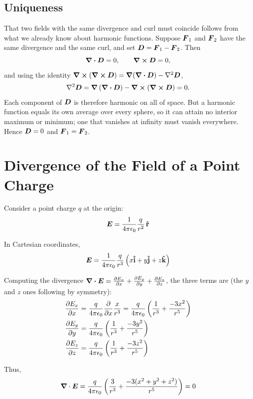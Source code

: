 \subsection{Uniqueness}

That two fields with the same divergence and curl must coincide follows from what we already know about harmonic functions. Suppose $\vect{F}_1$ and $\vect{F}_2$ have the same divergence and the same curl, and set $\vect{D} = \vect{F}_1 - \vect{F}_2$. Then
\[
    \div\vect{D} = 0, \qquad \curl\vect{D} = 0,
\]
and using the identity $\curl(\curl\vect{D}) = \grad(\div\vect{D}) - \laplacian{\vect{D}}$,
\[
    \laplacian{\vect{D}} = \grad\left(\div\vect{D}\right) - \curl\left(\curl\vect{D}\right) = 0 .
\]
Each component of $\vect{D}$ is therefore harmonic on all of space. But a harmonic function equals its own average over every sphere, so it can attain no interior maximum or minimum; one that vanishes at infinity must vanish everywhere. Hence $\vect{D} = 0$ and $\vect{F}_1 = \vect{F}_2$.

\section{Divergence of the Field of a Point Charge}

Consider a point charge $q$ at the origin:
\[
    \vect{E} = \frac{1}{4\pi\epsilon_0} \frac{q}{r^2} \,\rhat
\]

In Cartesian coordinates,
\[
    \vect{E} = \frac{1}{4\pi\epsilon_0} \frac{q}{r^3}\left(x\ihat + y\jhat + z\khat\right)
\]

Computing the divergence $\div\vect{E} = \pdv{E_x}{x} + \pdv{E_y}{y} + \pdv{E_z}{z}$, the three terms are (the $y$ and $z$ ones following by symmetry):
\begin{align*}
    \pdv{E_x}{x} &= \frac{q}{4\pi\epsilon_0} \pdv{}{x}\frac{x}{r^3}
    = \frac{q}{4\pi\epsilon_0}\left(\frac{1}{r^3} + \frac{-3x^2}{r^5}\right) \\
    \pdv{E_y}{y} &= \frac{q}{4\pi\epsilon_0}\left(\frac{1}{r^3} + \frac{-3y^2}{r^5}\right) \\
    \pdv{E_z}{z} &= \frac{q}{4\pi\epsilon_0}\left(\frac{1}{r^3} + \frac{-3z^2}{r^5}\right)
\end{align*}

Thus,
\[
    \grad\cdot\vect{E} = \frac{q}{4\pi\epsilon_0}\left(\frac{3}{r^3} + \frac{-3(x^2+y^2+z^2)}{r^5}\right) = 0
\]

